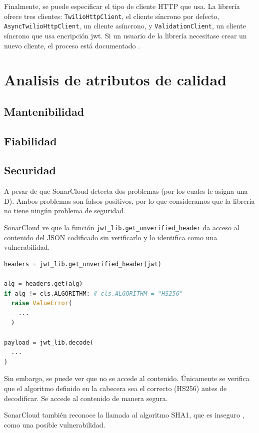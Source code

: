 \documentclass{article}
\begin{document}
Finalmente, se puede especificar el tipo de cliente HTTP que usa.
La librería ofrece tres clientes:
\verb|TwilioHttpClient|, el cliente síncrono por defecto,
\verb|AsyncTwilioHttpClient|, un cliente asíncrono, y
\verb|ValidationClient|, un cliente síncrono que usa encripción jwt.
Si un usuario de la librería necesitase crear un nuevo cliente,
el proceso está documentado
\cite{crear-cliente-http}.

\section{Analisis de atributos de calidad}

\subsection{Mantenibilidad}

\subsection{Fiabilidad}

\subsection{Securidad}

A pesar de que SonarCloud detecta dos problemas
(por los cuales le asigna una D).
Ambos problemas son falsos positivos, 
por lo que consideramos que la librería no tiene ningún problema de seguridad.

\hfill

SonarCloud ve que la función \verb|jwt_lib.get_unverified_header|
da acceso al contenido del JSON codificado sin verificarlo
y lo identifica como una vulnerabilidad.

\begin{lstlisting}[language=Python]
headers = jwt_lib.get_unverified_header(jwt)

alg = headers.get(alg)
if alg != cls.ALGORITHM: # cls.ALGORITHM = "HS256"
  raise ValueError(
    ...
  )

payload = jwt_lib.decode(
  ...
)
\end{lstlisting}

Sin embargo, se puede ver que no se accede al contenido.
Únicamente se verifica que el algoritmo definido en la cabecera
sea el correcto (HS256) antes de decodificar.
Se accede al contenido de manera segura.

\hfill

SonarCloud también reconoce la llamada al algoritmo SHA1,
que es inseguro \cite{sha1-broken},
como una posible vulnerabilidad.
\end{document}
